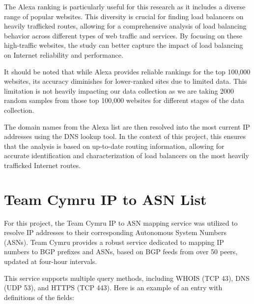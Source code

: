 \documentclass[12pt]{cwru_thesis}
\begin{document}
The Alexa ranking is particularly useful for this research as it includes a diverse range of popular websites. This diversity is crucial for finding load balancers on heavily trafficked routes, allowing for a comprehensive analysis of load balancing behavior across different types of web traffic and services. By focusing on these high-traffic websites, the study can better capture the impact of load balancing on Internet reliability and performance.

It should be noted that while Alexa provides reliable rankings for the top 100,000 websites, its accuracy diminishes for lower-ranked sites due to limited data. This limitation is not heavily impacting  our data collection as we are taking 2000 random samples from those top 100,000 websites for different stages of the data collection.

The domain names from the Alexa list are then resolved into the most current IP addresses using the DNS lookup tool. In the context of this project, this ensures that the analysis is based on up-to-date routing information, allowing for accurate identification and characterization of load balancers on the most heavily trafficked Internet routes.

\section{Team Cymru IP to ASN List}

For this project, the Team Cymru IP to ASN mapping service was utilized to resolve IP addresses to their corresponding Autonomous System Numbers (ASNs). Team Cymru provides a robust service dedicated to mapping IP numbers to BGP prefixes and ASNs, based on BGP feeds from over 50 peers, updated at four-hour intervals.

This service supports multiple query methods, including WHOIS (TCP 43), DNS (UDP 53), and HTTPS (TCP 443). Here is an example of an entry with definitions of the fields:
\end{document}
